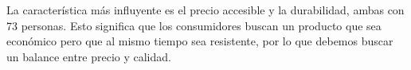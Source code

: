 
La característica más influyente es el precio accesible y la durabilidad, ambas con 73 personas. Esto significa que los consumidores buscan un producto que sea económico pero que al mismo tiempo sea resistente, por lo que debemos buscar un balance entre precio y calidad.
